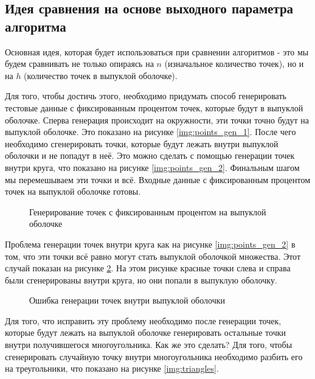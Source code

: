 \subsection{Идея сравнения на основе выходного параметра алгоритма}

Основная идея, которая будет использоваться при сравнении алгоритмов - это мы будем сравнивать не только опираясь на $n$ (изначальное количество точек), но и на $h$ (количество точек в выпуклой оболочке).

Для того, чтобы достичь этого, необходимо придумать способ генерировать тестовые данные с фиксированным процентом точек, которые будут в выпуклой оболочке. Сперва генерация происходит на окружности, эти точки точно будут на выпуклой оболочке. Это показано на рисунке \ref{img:points_gen_1}. После чего необходимо сгенерировать точки, которые будут лежать внутри выпуклой оболочки и не попадут в неё. Это можно сделать с помощью генерации точек внутри круга, что показано на рисунке \ref{img:points_gen_2}. Финальным шагом мы перемешываем эти точки и всё. Входные данные с фиксированным процентом точек на выпуклой оболочке готовы.

\begin{figure}[H]
	{\centering
		\hfill
		\subbottom[\label{img:points_gen_1}]{%
			}
		\hfill
		\subbottom[\label{img:points_gen_2}]{%
			}
		\hfill
	}
	\caption{Генерирование точек с фиксированным процентом на выпуклой оболочке}
	\label{img:points_gen}
\end{figure}

Проблема генерации точек внутри круга как на рисунке \ref{img:points_gen_2} в том, что эти точки всё равно могут стать выпуклой оболочкой множества. Этот случай показан на рисунке \ref{img:gen_error}. На этом рисунке красные точки слева и справа были сгенерированы внутри круга, но они попали в выпуклую оболочку.

\begin{figure}[H]
	\centering
	
	\caption{Ошибка генерации точек внутри выпуклой оболочки}
	\label{img:gen_error}
\end{figure}

Для того, что исправить эту проблему необходимо после генерации точек, которые будут лежать на выпуклой оболочке генерировать остальные точки внутри получившегося многоугольника. Как же это сделать? Для того, чтобы сгенерировать случайную точку внутри многоугольника необходимо разбить его на треугольники, что показано на рисунке \ref{img:triangles}.

